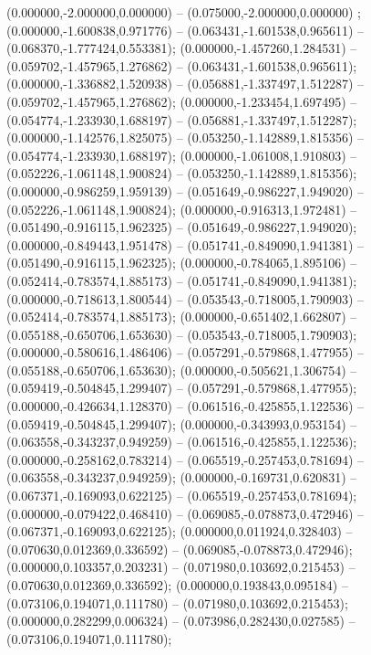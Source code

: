  (0.000000,-2.000000,0.000000) -- (0.075000,-2.000000,0.000000) ;
 (0.000000,-1.600838,0.971776) -- (0.063431,-1.601538,0.965611) -- (0.068370,-1.777424,0.553381);
 (0.000000,-1.457260,1.284531) -- (0.059702,-1.457965,1.276862) -- (0.063431,-1.601538,0.965611);
 (0.000000,-1.336882,1.520938) -- (0.056881,-1.337497,1.512287) -- (0.059702,-1.457965,1.276862);
 (0.000000,-1.233454,1.697495) -- (0.054774,-1.233930,1.688197) -- (0.056881,-1.337497,1.512287);
 (0.000000,-1.142576,1.825075) -- (0.053250,-1.142889,1.815356) -- (0.054774,-1.233930,1.688197);
 (0.000000,-1.061008,1.910803) -- (0.052226,-1.061148,1.900824) -- (0.053250,-1.142889,1.815356);
 (0.000000,-0.986259,1.959139) -- (0.051649,-0.986227,1.949020) -- (0.052226,-1.061148,1.900824);
 (0.000000,-0.916313,1.972481) -- (0.051490,-0.916115,1.962325) -- (0.051649,-0.986227,1.949020);
 (0.000000,-0.849443,1.951478) -- (0.051741,-0.849090,1.941381) -- (0.051490,-0.916115,1.962325);
 (0.000000,-0.784065,1.895106) -- (0.052414,-0.783574,1.885173) -- (0.051741,-0.849090,1.941381);
 (0.000000,-0.718613,1.800544) -- (0.053543,-0.718005,1.790903) -- (0.052414,-0.783574,1.885173);
 (0.000000,-0.651402,1.662807) -- (0.055188,-0.650706,1.653630) -- (0.053543,-0.718005,1.790903);
 (0.000000,-0.580616,1.486406) -- (0.057291,-0.579868,1.477955) -- (0.055188,-0.650706,1.653630);
 (0.000000,-0.505621,1.306754) -- (0.059419,-0.504845,1.299407) -- (0.057291,-0.579868,1.477955);
 (0.000000,-0.426634,1.128370) -- (0.061516,-0.425855,1.122536) -- (0.059419,-0.504845,1.299407);
 (0.000000,-0.343993,0.953154) -- (0.063558,-0.343237,0.949259) -- (0.061516,-0.425855,1.122536);
 (0.000000,-0.258162,0.783214) -- (0.065519,-0.257453,0.781694) -- (0.063558,-0.343237,0.949259);
 (0.000000,-0.169731,0.620831) -- (0.067371,-0.169093,0.622125) -- (0.065519,-0.257453,0.781694);
 (0.000000,-0.079422,0.468410) -- (0.069085,-0.078873,0.472946) -- (0.067371,-0.169093,0.622125);
 (0.000000,0.011924,0.328403) -- (0.070630,0.012369,0.336592) -- (0.069085,-0.078873,0.472946);
 (0.000000,0.103357,0.203231) -- (0.071980,0.103692,0.215453) -- (0.070630,0.012369,0.336592);
 (0.000000,0.193843,0.095184) -- (0.073106,0.194071,0.111780) -- (0.071980,0.103692,0.215453);
 (0.000000,0.282299,0.006324) -- (0.073986,0.282430,0.027585) -- (0.073106,0.194071,0.111780);
